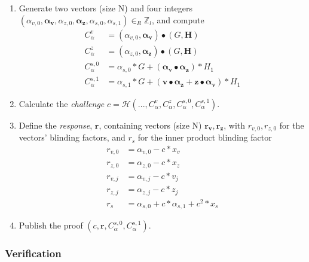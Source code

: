 \begin{enumerate}
	\item Generate two vectors (size N) and four integers \((\alpha_{v,0}, \boldsymbol{\alpha_v}, \alpha_{z,0}, \boldsymbol{\alpha_z}, \alpha_{s,0}, \alpha_{s,1}) \in_R \mathbb{Z}_l\), and compute
	\begin{align*}
	C_{\alpha}^{v} &= (\alpha_{v,0},\boldsymbol{\alpha_v}) \bullet (G,\textbf{H}) \\
	C_{\alpha}^{z} &= (\alpha_{z,0}, \boldsymbol{\alpha_z}) \bullet (G,\textbf{H}) \\
	C_{\alpha}^{s,0} &= \alpha_{s,0}*G + (\boldsymbol{\alpha_v} \bullet \boldsymbol{\alpha_z})*H_1 \\
	C_{\alpha}^{s,1} &= \alpha_{s,1}*G + (\boldsymbol{v} \bullet \boldsymbol{\alpha_z} + \boldsymbol{z} \bullet \boldsymbol{\alpha_v})*H_1
	\end{align*}
	\item Calculate the {\em challenge} $c = \mathcal{H}(...,C_{\alpha}^{v},C_{\alpha}^{z},C_{\alpha}^{s,0},C_{\alpha}^{s,1})$.
	\item Define the {\em response}, $\boldsymbol{r}$, containing vectors (size N) $\boldsymbol{r_v}, \boldsymbol{r_z}$, with $r_{v,0}, r_{z,0}$ for the vectors' blinding factors, and $r_s$ for the inner product blinding factor
	\begin{align*}
	r_{v,0} &= \alpha_{v,0} - c*x_v \\
	r_{z,0} &= \alpha_{z,0} - c*x_z \\
	r_{v,j} &= \alpha_{v,j} - c*v_j \\
	r_{z,j} &= \alpha_{z,j} - c*z_j \\
	r_s &= \alpha_{s,0} + c*\alpha_{s,1} + c^2*x_s 
	\end{align*}
	\item Publish the proof $(c, \boldsymbol{r}, C^{s,0}_{\alpha}, C^{s,1}_{\alpha})$.
\end{enumerate}

\subsubsection*{Verification}


